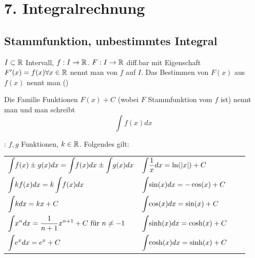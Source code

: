\section{7. Integralrechnung}

\subsection{Stammfunktion, unbestimmtes Integral}

\Def $I \subset \mathbb{R}$ Intervall, $f: I \to \mathbb{R}$. $F: I \to \mathbb{R}$ diff.bar mit Eigenschaft
$F'(x) = f(x) \forall x \in \mathbb{R}$ nennt man  von $f$ auf $I$. Das 
Bestimmen von $F(x)$ aus $f(x)$ nennt man () 

\Def Die Familie Funktionen $F(x) + C$ (wobei $F$ Stammfunktion vom  $f$ ist)
nennt man  und man schreibt
$$\int f(x) dx$$

\Satz {}: $f,g$ Funktionen, $k \in \mathbb{R}$. Folgendes gilt:
\vspace{-0.6em}

\begin{tabular}{llll}
    $\displaystyle \int \hspace{-2pt} f(x) \pm g(x)dx = \int \hspace{-2pt} f(x) dx \pm \int \hspace{-2pt} g(x) dx$ & \hspace{-14pt}
    $\displaystyle \int \hspace{-2pt} \frac{1}{x} dx = \ln(|x|) + C$ \\
    
    $\displaystyle \int \hspace{-2pt} k f(x) dx = k \int \hspace{-2pt} f(x) dx$ & \hspace{-14pt}
    $\displaystyle \int \hspace{-2pt} \sin(x) dx = -\cos(x) + C$ \\
    
    $\displaystyle \int \hspace{-2pt} k dx = kx + C$ & \hspace{-14pt}
    $\displaystyle \int \hspace{-2pt} \cos(x) dx = \sin(x) + C$ \\
    
    $\displaystyle \int \hspace{-2pt} x^n dx = \frac{1}{n+1}x^{n+1} + C \text{ für } n \ne -1$ & \hspace{-14pt}
    $\displaystyle \int \hspace{-2pt} \sinh(x) dx = \cosh(x) + C$ \\
    
    $\displaystyle \int \hspace{-2pt} e^x dx = e^x + C$ & \hspace{-14pt}
    $\displaystyle \int \hspace{-2pt} \cosh(x) dx = \sinh(x) + C$
\end{tabular}

